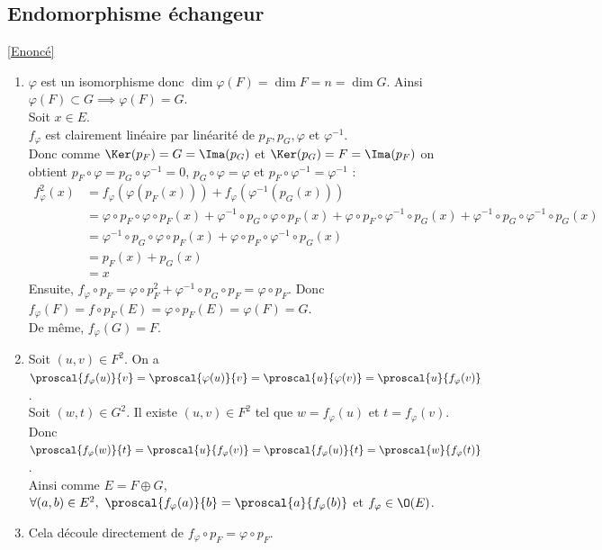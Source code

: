 \documentclass[8pt]{book}
\begin{document}
	\subsection{Endomorphisme échangeur}
	\label{Endomorphisme échangeur corrigé}
	\textcolor{blue}{\hyperref[Endomorphisme échangeur]{[Enoncé]}}\\
	\begin{enumerate}[leftmargin=*]
		\item $\varphi$ est un isomorphisme donc $\dim\varphi(F)=\dim F=n=\dim G$. Ainsi $\varphi(F)\subset G\implies \varphi(F)=G$.\\
		Soit $x\in E$.\\
		$f_\varphi$ est clairement linéaire par linéarité de $p_F,p_G,\varphi$ et $\varphi^{-1}$.\\
		Donc comme $\Ker(p_F)=G=\Ima(p_G)$ et $\Ker(p_G)=F=\Ima(p_F)$ on obtient $p_F\circ \varphi=p_G\circ \varphi^{-1}=0$, $p_G\circ \varphi=\varphi$ et $p_F\circ \varphi^{-1}=\varphi^{-1}$ :
		\begin{align*}
			f_\varphi^2(x)&=f_\varphi(\varphi(p_F(x)))+f_\varphi(\varphi^{-1}(p_G(x)))\\
			&=\varphi\circ p_F\circ \varphi \circ p_F(x)+\varphi^{-1}\circ p_G\circ \varphi\circ p_F(x)+\varphi\circ p_F\circ \varphi^{-1}\circ p_G(x)+\varphi^{-1}\circ p_G\circ \varphi^{-1}\circ p_G(x)\\
			&=\varphi^{-1}\circ p_G\circ \varphi\circ p_F(x)+\varphi\circ p_F\circ \varphi^{-1}\circ p_G(x)\\
			&=p_F(x)+p_G(x)\\
			&=x
		\end{align*}
		Ensuite, $f_\varphi\circ p_F=\varphi\circ p_F^2+\varphi^{-1}\circ p_G\circ p_F=\varphi\circ p_F$. Donc $f_\varphi(F)=f\circ p_F(E)=\varphi\circ p_F(E)=\varphi(F)=G$.\\
		De même, $f_\varphi(G)=F$.
		\item Soit $(u,v)\in F^2$. On a $\proscal{f_\varphi(u)}{v}=\proscal{\varphi(u)}{v}=\proscal{u}{\varphi(v)}=\proscal{u}{f_\varphi(v)}$.\\
		Soit $(w,t)\in G^2$. Il existe $(u,v)\in F^2$ tel que $w=f_\varphi(u)$ et $t=f_\varphi(v)$.\\
		Donc $\proscal{f_\varphi(w)}{t}=\proscal{u}{f_\varphi(v)}=\proscal{f_\varphi(u)}{t}=\proscal{w}{f_\varphi(t)}$.\\
		Ainsi comme $E=F\oplus G$, $\forall (a,b)\in E^2,\ \proscal{f_\varphi(a)}{b}=\proscal{a}{f_\varphi(b)}$ et $f_\varphi\in \O(E)$.
		\item Cela découle directement de $f_\varphi\circ p_F=\varphi\circ p_F$.
	\end{enumerate}
	
\end{document}
